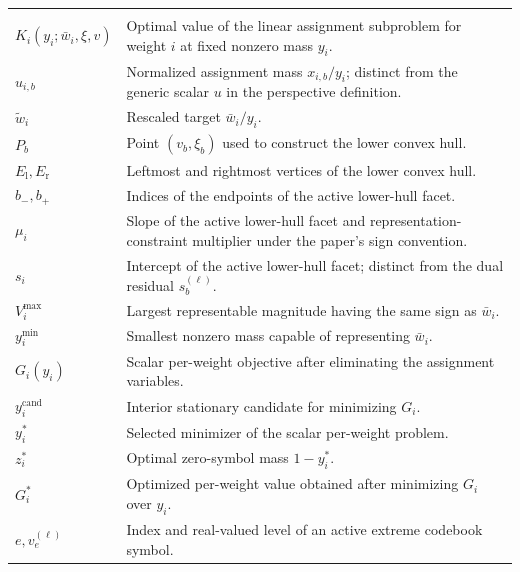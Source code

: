 \documentclass{article}
\begin{document}
\begin{longtable}{>{\raggedright\arraybackslash}p{}
                  >{\raggedright\arraybackslash}p{}}
  \addlinespace
  \multicolumn{2}{l}{\textit{Per-weight solution}}\\*
  $K_i(y_i;\bar w_i,\xi,v)$ & Optimal value of the linear assignment subproblem for weight $i$ at fixed nonzero mass $y_i$. \\
  $u_{i,b}$ & Normalized assignment mass $x_{i,b}/y_i$; distinct from the generic scalar $u$ in the perspective definition. \\
  $\widetilde w_i$ & Rescaled target $\bar w_i/y_i$. \\
  $P_b$ & Point $(v_b,\xi_b)$ used to construct the lower convex hull. \\
  $E_{\mathrm l},E_{\mathrm r}$ & Leftmost and rightmost vertices of the lower convex hull. \\
  $b_-,b_+$ & Indices of the endpoints of the active lower-hull facet. \\
  $\mu_i$ & Slope of the active lower-hull facet and representation-constraint multiplier under the paper's sign convention. \\
  $s_i$ & Intercept of the active lower-hull facet; distinct from the dual residual $s_b^{(\ell)}$. \\
  $V_i^{\max}$ & Largest representable magnitude having the same sign as $\bar w_i$. \\
  $y_i^{\min}$ & Smallest nonzero mass capable of representing $\bar w_i$. \\
  $G_i(y_i)$ & Scalar per-weight objective after eliminating the assignment variables. \\
  $y_i^{\mathrm{cand}}$ & Interior stationary candidate for minimizing $G_i$. \\
  $y_i^*$ & Selected minimizer of the scalar per-weight problem. \\
  $z_i^*$ & Optimal zero-symbol mass $1-y_i^*$. \\
  $G_i^*$ & Optimized per-weight value obtained after minimizing $G_i$ over $y_i$. \\
  $e,v_e^{(\ell)}$ & Index and real-valued level of an active extreme codebook symbol. \\


\end{longtable}
\end{document}
